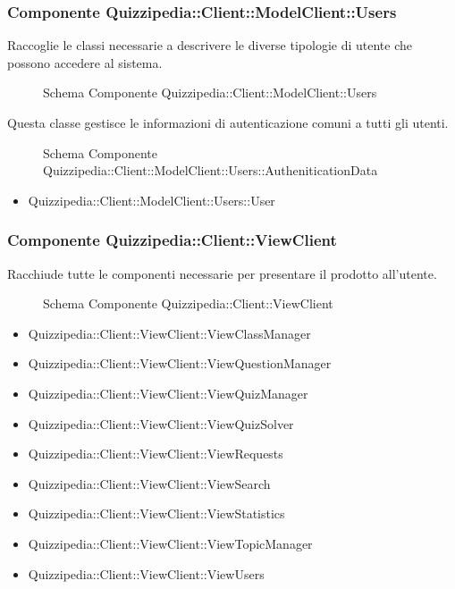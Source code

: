 \subsubsection{Componente Quizzipedia::Client::ModelClient::Users}
Raccoglie le classi necessarie a descrivere le diverse tipologie di utente che possono accedere al sistema.
\begin{figure}[H]
\centering
\noindent{}
\caption{Schema Componente Quizzipedia::Client::ModelClient::Users}
\end{figure}
Questa classe gestisce le informazioni di autenticazione comuni a tutti gli utenti.
\begin{figure}[H]
\centering
\noindent{}
\caption{Schema Componente Quizzipedia::Client::ModelClient::Users::AutheniticationData}
\end{figure}
\begin{itemize}
\item Quizzipedia::Client::ModelClient::Users::User
\end{itemize}
\subsubsection{Componente Quizzipedia::Client::ViewClient}
Racchiude tutte le componenti necessarie per presentare il prodotto all'utente.
\begin{figure}[H]
\centering
\noindent{}
\caption{Schema Componente Quizzipedia::Client::ViewClient}
\end{figure}
\begin{itemize}
\item Quizzipedia::Client::ViewClient::ViewClassManager
\item Quizzipedia::Client::ViewClient::ViewQuestionManager
\item Quizzipedia::Client::ViewClient::ViewQuizManager
\item Quizzipedia::Client::ViewClient::ViewQuizSolver
\item Quizzipedia::Client::ViewClient::ViewRequests
\item Quizzipedia::Client::ViewClient::ViewSearch
\item Quizzipedia::Client::ViewClient::ViewStatistics
\item Quizzipedia::Client::ViewClient::ViewTopicManager
\item Quizzipedia::Client::ViewClient::ViewUsers
\end{itemize}
